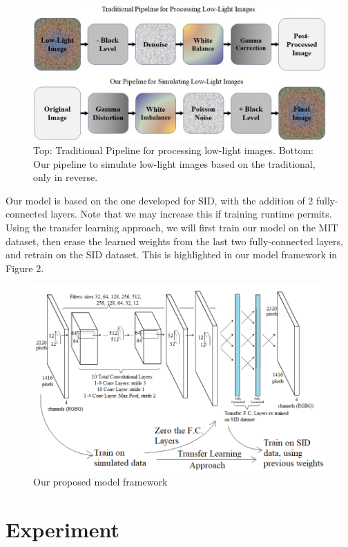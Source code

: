 \documentclass{article}
\begin{document}
\begin{figure}[ht]
  \centering
  \includegraphics[scale=0.35]{pipeline.jpg}
  \caption{Top: Traditional Pipeline for processing low-light images. Bottom: Our  pipeline to simulate low-light images based on the traditional, only in reverse.}
\end{figure}


Our model is based on the one developed for SID, with the addition of 2 fully-connected layers. Note that we may increase this if training runtime permits. Using the transfer learning approach, we will first train our model on the MIT dataset, then erase the learned weights from the last two fully-connected layers, and retrain on the SID dataset. This is highlighted in our model framework in Figure 2. 

\begin{figure}[ht]
  \centering
  \includegraphics[scale=0.5]{model.png}
  \caption{Our proposed model framework}
\end{figure}



\section{Experiment}
\end{document}
